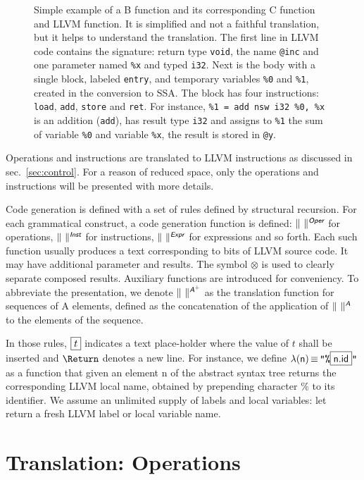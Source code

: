 \documentclass{llncs}
\newcommand{\trad}[2]{\ensuremath{\lVert \textsf{#1} \rVert^{\textit{#2}}}}
\newcommand{\nl}[0]{\text{\Return}}
\DeclareMathOperator{\isdef}{\equiv}
\DeclareMathOperator{\name}{\mathcal{L}()}
\newcommand{\llvm}[1]{\texttt{#1}}
\newcommand{\B}[1]{\textsf{#1}}
\newcommand{\ListOf}[1]{$\mbox{#1}^+$}
\newcommand{\PH}[1]{\framebox{$#1$}}
\newcommand{\sep}[0]{\otimes}
\newcommand{\local}[0]{\ensuremath{\sf\lambda}}
\begin{document}
\begin{figure}
\begin{minipage}[t]{.6\textwidth}
  \end{minipage}
  \caption{Simple example of a B function and its corresponding  C function and LLVM function.
    It is simplified and not a faithful translation, but it helps to understand the translation. 
    The first line in LLVM code contains the signature: return type \llvm{void}, the name
    \llvm{@inc} and one parameter named \llvm{\%x} and typed \llvm{i32}.  Next
    is the body with a single block, labeled \llvm{entry}, and temporary
    variables \llvm{\%0} and \llvm{\%1}, created in the conversion to SSA. The
    block has four instructions: \llvm{load}, \llvm{add}, \llvm{store} and
    \llvm{ret}. For instance, \llvm{\%1 = add nsw i32 \%0, \%x} is an addition
    (\llvm{add}), has result type \llvm{i32} and assigns to \llvm{\%1} the sum
    of variable \llvm{\%0} and  variable \llvm{\%x}, the result is stored in
     \llvm{@y}.}
  \label{fig:ex-llvm}
\end{figure}

Operations and instructions are translated to LLVM instructions as discussed in
sec.~\ref{sec:control}. For a reason of reduced space, only the operations and
instructions will be presented with more details.

Code generation is defined with a set of rules defined by structural
recursion. For each grammatical construct, a code generation function is
defined: $\trad{~}{\B{Oper}}$ for operations, $\trad{~}{\B{Inst}}$ for
instructions, $\trad{~}{\B{Expr}}$ for expressions and so forth. Each such
function usually produces a text corresponding to bits of LLVM source code. It
may have additional parameter and results. The symbol $\sep$ is used to clearly
separate composed results. Auxiliary functions are introduced for
conveniency. To abbreviate the presentation, we denote
$\trad{~}{\ListOf{\B{A}}}$ as the translation function for sequences of \B{A}
elements, defined as the concatenation of the application of $\trad{~}{\B{A}}$
to the elements of the sequence.

In those rules, $\PH{t}$ indicates a text place-holder where the value of $t$
shall be inserted and $\nl$ denotes a new line. For instance, we define
$\local(\B{n}) \isdef \llvm{"\%\PH{\B{n.id}}"}$ as a function that given an
element \B{n} of the abstract syntax tree returns the corresponding LLVM local
name, obtained by prepending character \% to its identifier. We assume an 
unlimited supply of labels and local variables: let $\name$ return a fresh LLVM
label or local variable name.

\section{Translation: Operations
\label{sec:control}}
\end{document}
